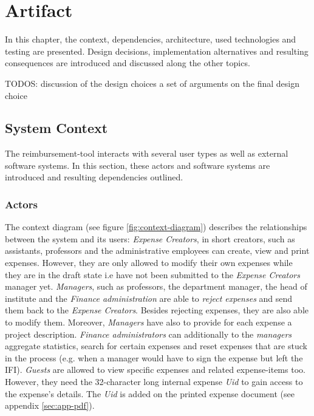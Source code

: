 \chapter{Artifact}

In this chapter, the context, dependencies, architecture, used technologies and testing are presented. Design decisions, implementation alternatives and resulting consequences are introduced and discussed along the other topics.


TODOS:
discussion of the design choices  a set of arguments on the final design choice



\section{System Context}

The reimbursement-tool interacts with several user types as well as external software systems. In this section, these actors and software systems are introduced and resulting dependencies outlined.

\subsection{Actors}

The context diagram (see figure \ref{fig:context-diagram}) describes the relationships between the system and its users:
\textit{Expense Creators}, in short creators, such as assistants, professors and the administrative employees can create, view and print expenses. However, they are only allowed to modify their own expenses while they are in the draft state i.e have not been submitted to the \textit{Expense Creators} manager yet.  \textit{Managers}, such as professors, the department manager, the head of institute and the \textit{Finance administration} are able to \textit{reject expenses} and send them back to the \textit{Expense Creators}. Besides rejecting expenses, they are also able to modify them. Moreover, \textit{Managers} have also to provide for each expense a project description. \textit{Finance administrators} can additionally to the \textit{managers} aggregate statistics, search for certain expenses and reset expenses that are stuck in the process (e.g. when a manager would have to sign the expense but left the IFI). \textit{Guests} are allowed to view specific expenses and related expense-items too. However, they need the 32-character long internal expense \textit{Uid} to gain access to the expense's details. The \textit{Uid} is added on the printed expense document (see appendix \ref{sec:app-pdf}).

